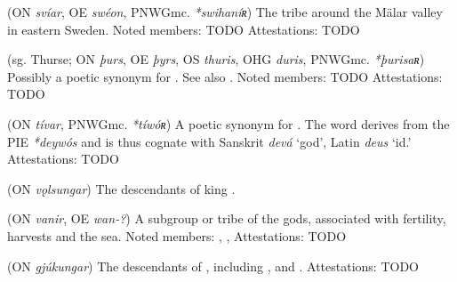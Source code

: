 \begin{itemize}
 (ON \emph{svíar}, OE \emph{swéon}, PNWGmc. \emph{*swihaníʀ})
  The tribe around the Mälar valley in eastern Sweden.
  Noted members: TODO
  Attestations: TODO

 (sg. Thurse; ON \emph{þurs}, OE \emph{þyrs}, OS \emph{thuris}, OHG \emph{duris}, PNWGmc. \emph{*þurisaʀ})
  Possibly a poetic synonym for . See also .
  Noted members: TODO
  Attestations: TODO

 (ON \emph{tívar}, PNWGmc. \emph{*tíwóʀ})
  A poetic synonym for .  The word derives from the PIE \emph{*deywós} and is thus cognate with Sanskrit \emph{devá} ‘god’, Latin \emph{deus} ‘id.’
  Attestations: TODO

 (ON \emph{vǫlsungar})
  The descendants of king .

 (ON \emph{vanir}, OE \emph{wan-?})
  A subgroup or tribe of the gods, associated with fertility, harvests and the sea.
  Noted members: , , 
  Attestations: TODO

 (ON \emph{gjúkungar})
  The descendants of , including ,  and .
  Attestations: TODO
\end{itemize}

